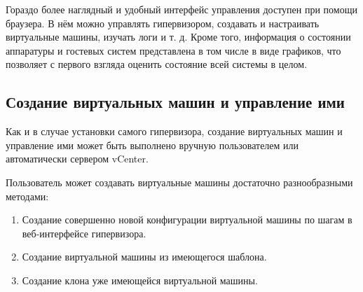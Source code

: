 \documentclass[14pt, a4paper]{article}
\begin{document}
Гораздо более наглядный и удобный интерфейс управления доступен при помощи браузера. В нём
можно управлять гипервизором, создавать и настраивать виртуальные машины, изучать логи и т. д.
Кроме того, информация о состоянии аппаратуры и гостевых систем представлена в том числе в виде
графиков, что позволяет с первого взгляда оценить состояние всей системы в целом.

\begin{figure}[h]%
    \centering
    \label{картинка 2.5} %
\end{figure}

\subsection*{Создание виртуальных машин и управление ими}

Как и в случае установки самого гипервизора, создание виртуальных машин и управление ими может
быть выполнено вручную пользователем или автоматически сервером vCenter.

Пользователь может создавать виртуальные машины достаточно разнообразными методами:

\begin{enumerate}
    \item Создание совершенно новой конфигурации виртуальной машины по шагам в веб-интерфейсе
    гипервизора.
    \item Создание виртуальной машины из имеющегося шаблона.
    \item Создание клона уже имеющейся виртуальной машины.
\end{enumerate}
\end{document}
